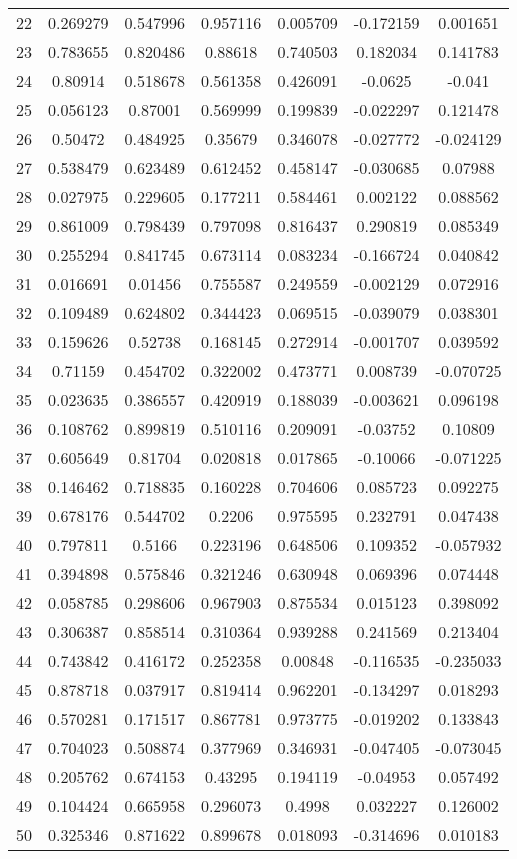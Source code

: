 \begin{table}
\begin{tabular}{c|c|c|c|c|c|c}
22 & 0.269279 & 0.547996 & 0.957116 & 0.005709 & -0.172159 & 0.001651\\
23 & 0.783655 & 0.820486 & 0.88618 & 0.740503 & 0.182034 & 0.141783\\
24 & 0.80914 & 0.518678 & 0.561358 & 0.426091 & -0.0625 & -0.041\\
25 & 0.056123 & 0.87001 & 0.569999 & 0.199839 & -0.022297 & 0.121478\\
26 & 0.50472 & 0.484925 & 0.35679 & 0.346078 & -0.027772 & -0.024129\\
27 & 0.538479 & 0.623489 & 0.612452 & 0.458147 & -0.030685 & 0.07988\\
28 & 0.027975 & 0.229605 & 0.177211 & 0.584461 & 0.002122 & 0.088562\\
29 & 0.861009 & 0.798439 & 0.797098 & 0.816437 & 0.290819 & 0.085349\\
30 & 0.255294 & 0.841745 & 0.673114 & 0.083234 & -0.166724 & 0.040842\\
31 & 0.016691 & 0.01456 & 0.755587 & 0.249559 & -0.002129 & 0.072916\\
32 & 0.109489 & 0.624802 & 0.344423 & 0.069515 & -0.039079 & 0.038301\\
33 & 0.159626 & 0.52738 & 0.168145 & 0.272914 & -0.001707 & 0.039592\\
34 & 0.71159 & 0.454702 & 0.322002 & 0.473771 & 0.008739 & -0.070725\\
35 & 0.023635 & 0.386557 & 0.420919 & 0.188039 & -0.003621 & 0.096198\\
36 & 0.108762 & 0.899819 & 0.510116 & 0.209091 & -0.03752 & 0.10809\\
37 & 0.605649 & 0.81704 & 0.020818 & 0.017865 & -0.10066 & -0.071225\\
38 & 0.146462 & 0.718835 & 0.160228 & 0.704606 & 0.085723 & 0.092275\\
39 & 0.678176 & 0.544702 & 0.2206 & 0.975595 & 0.232791 & 0.047438\\
40 & 0.797811 & 0.5166 & 0.223196 & 0.648506 & 0.109352 & -0.057932\\
41 & 0.394898 & 0.575846 & 0.321246 & 0.630948 & 0.069396 & 0.074448\\
42 & 0.058785 & 0.298606 & 0.967903 & 0.875534 & 0.015123 & 0.398092\\
43 & 0.306387 & 0.858514 & 0.310364 & 0.939288 & 0.241569 & 0.213404\\
44 & 0.743842 & 0.416172 & 0.252358 & 0.00848 & -0.116535 & -0.235033\\
45 & 0.878718 & 0.037917 & 0.819414 & 0.962201 & -0.134297 & 0.018293\\
46 & 0.570281 & 0.171517 & 0.867781 & 0.973775 & -0.019202 & 0.133843\\
47 & 0.704023 & 0.508874 & 0.377969 & 0.346931 & -0.047405 & -0.073045\\
48 & 0.205762 & 0.674153 & 0.43295 & 0.194119 & -0.04953 & 0.057492\\
49 & 0.104424 & 0.665958 & 0.296073 & 0.4998 & 0.032227 & 0.126002\\
50 & 0.325346 & 0.871622 & 0.899678 & 0.018093 & -0.314696 & 0.010183\\
\end{tabular}
\end{table}
